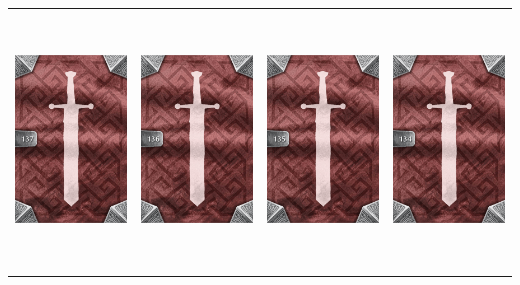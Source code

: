 \documentclass{minimal}
\begin{document}
{\begin{longtable}{llll}
\includegraphics[width=44mm,height=68mm]{./64-151/gh-137-silent-stiletto-back.png} &
\includegraphics[width=44mm,height=68mm]{./64-151/gh-136-volatile-elixir-back.png} &
\includegraphics[width=44mm,height=68mm]{./64-151/gh-135-focusing-ray-back.png} &
\includegraphics[width=44mm,height=68mm]{./64-151/gh-134-imposing-blade-back.png}\\ 

\end{longtable}}
\end{document}
